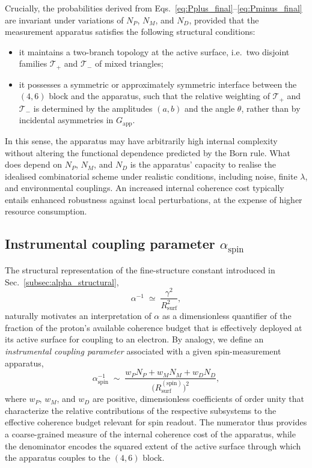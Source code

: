 \documentclass[11pt,a4paper]{article}
\numberwithin{equation}{section}
\begin{document}
Crucially, the probabilities derived from Eqs.~\eqref{eq:Pplus_final}--\eqref{eq:Pminus_final} are invariant under variations of $N_P$, $N_M$, and $N_D$, provided that the measurement apparatus satisfies the following structural conditions:
\begin{itemize}
  \item it maintains a two-branch topology at the active surface, i.e.\ two disjoint families $\mathcal{T}_+$ and $\mathcal{T}_-$ of mixed triangles;
  \item it possesses a symmetric or approximately symmetric interface between the $(4,6)$ block and the apparatus, such that the relative weighting of $\mathcal{T}_+$ and $\mathcal{T}_-$ is determined by the amplitudes $(a,b)$ and the angle $\theta$, rather than by incidental asymmetries in $G_{\mathrm{app}}$.
\end{itemize}
In this sense, the apparatus may have arbitrarily high internal complexity without altering the functional dependence predicted by the Born rule. What does depend on $N_P$, $N_M$, and $N_D$ is the apparatus’ capacity to realise the idealised combinatorial scheme under realistic conditions, including noise, finite $\lambda$, and environmental couplings. An increased internal coherence cost typically entails enhanced robustness against local perturbations, at the expense of higher resource consumption.

\subsection{Instrumental coupling parameter \texorpdfstring{$\alpha_{\text{spin}}$}{alpha\_spin}}
\label{subsec:alpha_spin}

The structural representation of the fine-structure constant introduced in Sec.~\ref{subsec:alpha_structural},
\begin{equation}
  \alpha^{-1} \;\simeq\; \frac{\gamma^2}{R_{\mathrm{surf}}^2},
\end{equation}
naturally motivates an interpretation of $\alpha$ as a dimensionless quantifier of the fraction of the proton’s available coherence budget that is effectively deployed at its active surface for coupling to an electron. By analogy, we define an \emph{instrumental coupling parameter} associated with a given spin-measurement apparatus,
\begin{equation}
  \alpha_{\mathrm{spin}}^{-1}
  \;\sim\;
  \frac{w_P N_P + w_M N_M + w_D N_D}
       {\big(R_{\mathrm{surf}}^{(\mathrm{spin})}\big)^2},
  \label{eq:alpha_spin_def}
\end{equation}
where $w_P$, $w_M$, and $w_D$ are positive, dimensionless coefficients of order unity that characterize the relative contributions of the respective subsystems to the effective coherence budget relevant for spin readout. The numerator thus provides a coarse-grained measure of the internal coherence cost of the apparatus, while the denominator encodes the squared extent of the active surface through which the apparatus couples to the $(4,6)$ block.
\end{document}
